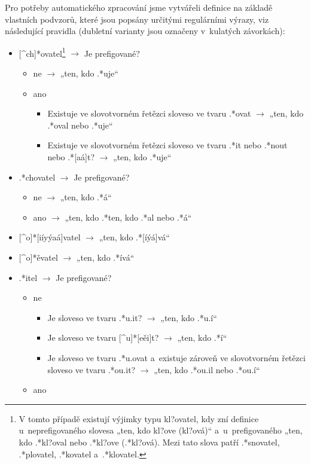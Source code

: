 Pro potřeby automatického zpracování jsme vytvářeli definice na základě
vlastních podvzorů, které jsou popsány určitými regulárními výrazy, viz
následující pravidla (dubletní varianty jsou označeny v~kulatých
závorkách):

\begin{itemize}
\tightlist
\item
  {[}\^{}ch{]}*ovatel\footnote{V tomto případě existují výjimky typu kl?ovatel, kdy zní definice u~neprefigovaného slovesa „ten, kdo kl?ove (kl?ová)“ a~u~prefigovaného „ten, kdo .*kl?oval nebo .*kl?ove (.*kl?ová). Mezi tato slova patří .*snovatel, .*plovatel, .*kovatel a~.*klovatel.}
  $\rightarrow$ Je prefigované?

  \begin{itemize}
  \tightlist
  \item
    ne $\rightarrow$ „ten, kdo .*uje``
  \item
    ano

    \begin{itemize}
    \tightlist
    \item
      Existuje ve slovotvorném řetězci sloveso ve tvaru .*ovat
      $\rightarrow$ „ten, kdo .*oval nebo .*uje``
    \item
      Existuje ve slovotvorném řetězci sloveso ve tvaru .*it nebo .*nout
      nebo .*{[}aá{]}t? $\rightarrow$ „ten, kdo .*uje``
    \end{itemize}
  \end{itemize}
\item
  .*chovatel $\rightarrow$ Je prefigované?

  \begin{itemize}
  \tightlist
  \item
    ne $\rightarrow$ „ten, kdo .*á``
  \item
    ano $\rightarrow$ „ten, kdo .*ten, kdo .*al nebo .*á``
  \end{itemize}
\item
  {[}\^{}o{]}*{[}iíyýaá{]}vatel $\rightarrow$ „ten, kdo
  .*{[}íýá{]}vá``
\item
  {[}\^{}o{]}*ěvatel $\rightarrow$ „ten, kdo .*ívá``
\item
  .*itel $\rightarrow$ Je prefigované?

  \begin{itemize}
  \tightlist
  \item
    ne

    \begin{itemize}
    \tightlist
    \item
      Je sloveso ve tvaru .*u.it? $\rightarrow$ „ten, kdo .*u.í``
    \item
      Je sloveso ve tvaru {[}\^{}u{]}*{[}eěi{]}t? $\rightarrow$ „ten,
      kdo .*í``
    \item
      Je sloveso ve tvaru .*u.ovat a~existuje zároveň ve slovotvorném
      řetězci sloveso ve tvaru .*ou.it? $\rightarrow$ „ten, kdo
      .*ou.il nebo .*ou.í``
    \end{itemize}
  \item
    ano


\end{itemize}
\end{itemize}
